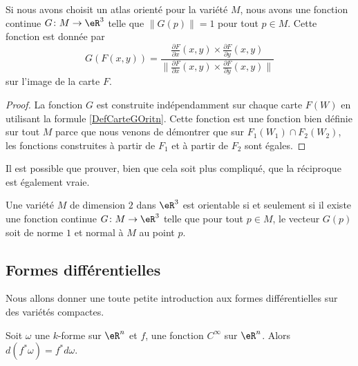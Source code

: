 \begin{corollary}
	Si nous avons choisit un atlas orienté pour la variété $M$, nous avons une fonction continue $G\colon M\to \eR^3$ telle que $\| G(p) \|=1$ pour tout $p\in M$. Cette fonction est donnée par
	\begin{equation}		\label{DefCarteGOritn}
		G(F(x,y))=\frac{   \frac{ \partial F }{ \partial x }(x,y)\times\frac{ \partial F }{ \partial y }(x,y)   }{ \| \frac{ \partial F }{ \partial x }(x,y)\times\frac{ \partial F }{ \partial y }(x,y)\| }
	\end{equation}
	sur l'image de la carte $F$.
\end{corollary}

\begin{proof}
	La fonction $G$ est construite indépendamment sur chaque carte $F(W)$ en utilisant la formule \eqref{DefCarteGOritn}. Cette fonction est une fonction bien définie sur tout $M$ parce que nous venons de démontrer que sur $F_1(W_1)\cap F_2(W_2)$, les fonctions construites à partir de $F_1$ et à partir de $F_2$ sont égales.
\end{proof}

Il est possible que prouver, bien que cela soit plus compliqué, que la réciproque est également vraie.
\begin{proposition}
	Une variété $M$ de dimension $2$ dans $\eR^3$ est orientable si et seulement si il existe une fonction continue $G\colon M\to \eR^3$ telle que pour tout $p\in M$, le vecteur $G(p)$ soit de norme $1$ et normal à $M$ au point $p$.
\end{proposition}

\subsection{Formes différentielles}

Nous allons donner une toute petite introduction aux formes différentielles sur des variétés compactes.

\begin{lemma}       \label{LemdwLGFG}
    Soit \( \omega\) une \( k\)-forme sur \( \eR^n\) et \( f\), une fonction \( C^{\infty}\) sur \( \eR^n\). Alors \( d(f^*\omega)=f^*d\omega\).
\end{lemma}

